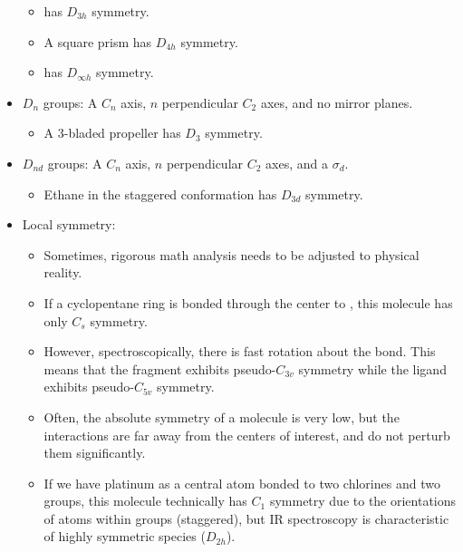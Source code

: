 \documentclass[../main.tex]{subfiles}
\begin{document}
\begin{itemize}
\begin{itemize}
        \item {} has $D_{3h}$ symmetry.
        \item A square prism has $D_{4h}$ symmetry.
        \item {} has $D_{\infty h}$ symmetry.
    \end{itemize}
    \item $D_n$ groups: A $C_n$ axis, $n$ perpendicular $C_2$ axes, and no mirror planes.
    \begin{itemize}
        \item A 3-bladed propeller has $D_3$ symmetry.
    \end{itemize}
    \item $D_{nd}$ groups: A $C_n$ axis, $n$ perpendicular $C_2$ axes, and a $\sigma_d$.
    \begin{itemize}
        \item Ethane in the staggered conformation has $D_{3d}$ symmetry.
    \end{itemize}
    \item Local symmetry:
    \begin{itemize}
        \item Sometimes, rigorous math analysis needs to be adjusted to physical reality.
        \item If a cyclopentane ring is bonded through the center to , this molecule has only $C_s$ symmetry.
        \item However, spectroscopically, there is fast rotation about the  bond. This means that the  fragment exhibits pseudo-$C_{3v}$ symmetry while the  ligand exhibits pseudo-$C_{5v}$ symmetry.
        \item Often, the absolute symmetry of a molecule is very low, but the interactions are far away from the centers of interest, and do not perturb them significantly.
        \item If we have platinum as a central atom bonded to two chlorines and two  groups, this molecule technically has $C_1$ symmetry due to the orientations of atoms within  groups (staggered), but IR spectroscopy is characteristic of highly symmetric species ($D_{2h}$).
    \end{itemize}
\end{itemize}
\end{document}
